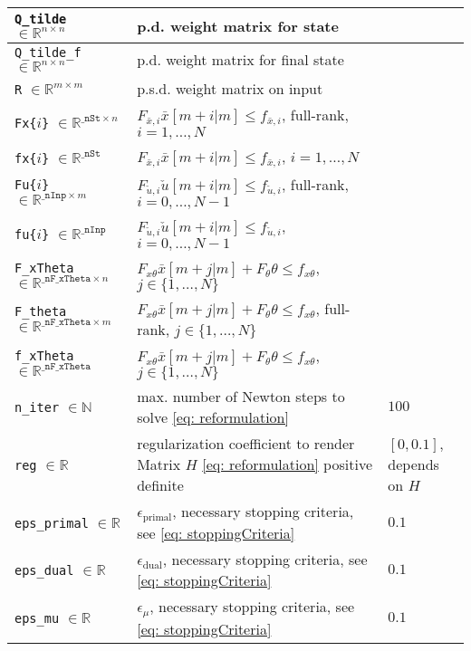 \documentclass[letter]{article}
\begin{document}
\begin{sffamily}
\begin{table}[!htdp]
\begin{center}
\begin{tabular}{|l|l|l|}
 \texttt{Q\_tilde} $\in\mathbb{R}^{n\times n}$ & p.d. weight matrix for state & \\ \hline
 \texttt{Q\_tilde\_f} $\in\mathbb{R}^{n\times n}$ & p.d. weight matrix for final state & \\ \hline
 \texttt{R} $\in\mathbb{R}^{m\times m}$ & p.s.d. weight matrix on input & \\ \hline
 \texttt{Fx\{$i$\}} $\in\mathbb{R}^{\texttt{\_nSt}\times n}$ & $F_{\bar{x},i}\bar{x}[m+i|m] \leq f_{\bar{x},i}$, full-rank, $i=1,\ldots,N$ & \\ \hline
 \texttt{fx\{$i$\}} $\in\mathbb{R}^{\texttt{\_nSt}}$ & $F_{\bar{x},i}\bar{x}[m+i|m] \leq f_{\bar{x},i}$, $i=1,\ldots,N$ & \\ \hline
 \texttt{Fu\{$i$\}} $\in\mathbb{R}^{\texttt{\_nInp}\times m}$ & $F_{\check{u},i}\check{u}[m+i|m] \leq f_{\check{u},i}$, full-rank, $i=0,\ldots,N-1$ & \\ \hline
 \texttt{fu\{$i$\}} $\in\mathbb{R}^{\texttt{\_nInp}}$ & $F_{\check{u},i}\check{u}[m+i|m] \leq f_{\check{u},i}$, $i=0,\ldots,N-1$ & \\ \hline
 \texttt{F\_xTheta} $\in\mathbb{R}^{\texttt{\_nF\_xTheta}\times n}$ & $F_{x\theta}\bar{x}[m+j|m] + F_\theta \theta \leq f_{x\theta}$, $j\in\{1,\ldots,N\}$ & \\ \hline
 \texttt{F\_theta} $\in\mathbb{R}^{\texttt{\_nF\_xTheta}\times m}$ & $F_{x\theta}\bar{x}[m+j|m] + F_\theta \theta \leq f_{x\theta}$, full-rank, $j\in\{1,\ldots,N\}$ & \\ \hline
 \texttt{f\_xTheta} $\in\mathbb{R}^{\texttt{\_nF\_xTheta}}$ & $F_{x\theta}\bar{x}[m+j|m] + F_\theta \theta \leq f_{x\theta}$, $j\in\{1,\ldots,N\}$ & \\ \hline \hline

 \texttt{n\_iter} $\in\mathbb{N}$ & max. number of Newton steps to solve \eqref{eq: reformulation} & $100$ \\ \hline
 \texttt{reg} $\in\mathbb{R}$  & regularization coefficient to render Matrix $H$ \eqref{eq: reformulation} positive definite & $[0,0.1]$, depends on $H$ \\ \hline
 \texttt{eps\_primal}  $\in\mathbb{R}$& $\epsilon_\text{primal}$, necessary stopping criteria, see \eqref{eq: stoppingCriteria} & $0.1$ \\ \hline
 \texttt{eps\_dual} $\in\mathbb{R}$ & $\epsilon_\text{dual}$, necessary stopping criteria, see \eqref{eq: stoppingCriteria} & $0.1$ \\ \hline
 \texttt{eps\_mu} $\in\mathbb{R}$ & $\epsilon_\mu$, necessary stopping criteria, see \eqref{eq: stoppingCriteria} & $0.1$ \\ \hline
\end{tabular}
\end{center}
\label{tab: parameters Init.m}
\end{table}


\end{sffamily}
\end{document}
